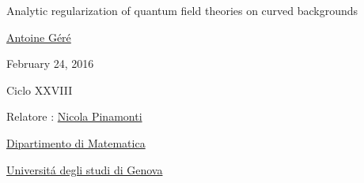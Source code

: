 \documentclass[9pt]{beamer}
\begin{document}




{%
\begin{frame}[plain]
%
Analytic regularization of quantum field theories on curved backgrounds\par
\href{mailto:gere@dima.unige.it}{Antoine Géré}\par
February 24, 2016\par
Ciclo XXVIII\par
Relatore : \href{mailto:pinamont@dima.unige.it}{Nicola Pinamonti}\par
\href{http://www.dima.unige.it/}{Dipartimento di Matematica}\par
\href{https://www.unige.it/}{Universitá degli studi di Genova}\par
\end{frame}
}%

\end{document}
